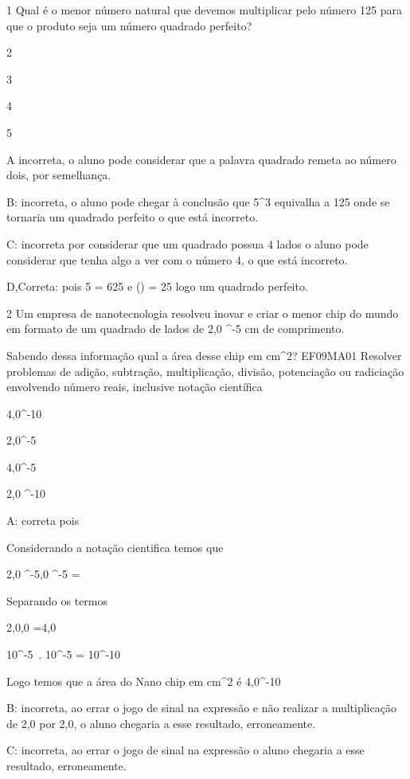 \num{1} Qual é o menor número natural que devemos multiplicar pelo número 125
para que o produto seja um número quadrado perfeito?

\item 2
\item 3
\item 4
\item 5

A incorreta, o aluno pode considerar que a palavra quadrado remeta ao
número dois, por semelhança.

B: incorreta, o aluno pode chegar à conclusão que 5^3 equivalha a 125
onde se tornaria um quadrado perfeito o que está incorreto.

C: incorreta por considerar que um quadrado possua 4 lados o aluno pode
considerar que tenha algo a ver com o número 4, o que está incorreto.

D,Correta: pois 5 = 625 e () = 25 logo um quadrado
perfeito.

\num{2} Um empresa de nanotecnologia resolveu inovar e criar o menor chip do
mundo em formato de um quadrado de lados de 2,0
^-5 cm de comprimento.

Sabendo dessa informação qual a área desse chip em cm^2? EF09MA01
Resolver problemas de adição, subtração, multiplicação, divisão,
potenciação ou radiciação envolvendo número reais, inclusive notação
científica

\item 4,0^-10
\item 2,0^-5
\item 4,0^-5
\item 2,0 ^-10

A: correta pois

Considerando a notação cientifica temos que

2,0 ^-5,0
 ^-5 =

Separando os termos

2,0,0 =4,0

10^-5~. 10^-5 =
10^-10

Logo temos que a área do Nano chip em cm^2 é 4,0^-10

B: incorreta, ao errar o jogo de sinal na expressão e não realizar a
multiplicação de 2,0 por 2,0, o aluno chegaria a esse resultado,
erroneamente.

C: incorreta, ao errar o jogo de sinal na expressão o aluno chegaria a
esse resultado, erroneamente.

